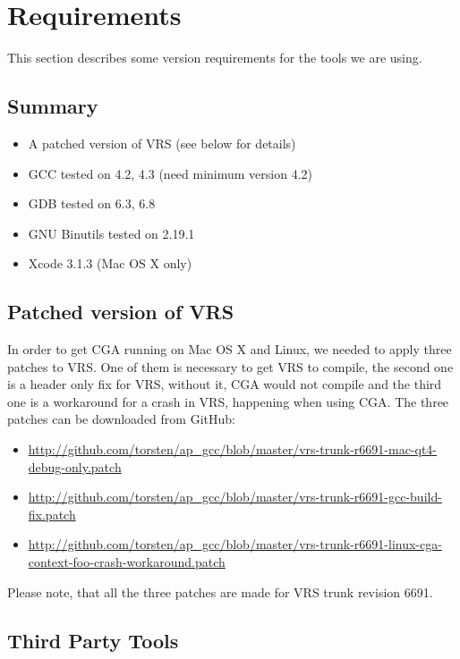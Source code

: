 
\section{Requirements} This section describes some version requirements for the tools we are using. 

\subsection{Summary}
\begin{itemize}
  \item A patched version of VRS (see below for details)
	\item GCC tested on 4.2, 4.3 (need minimum version 4.2)
	\item GDB tested on 6.3, 6.8
	\item GNU Binutils tested on 2.19.1
	\item Xcode 3.1.3 (Mac OS X only)
\end{itemize}

\subsection{Patched version of VRS}

In order to get CGA running on Mac OS X and Linux, we needed to apply three patches to VRS. One of them is necessary to get VRS to compile, the second one is a header only fix for VRS, without it, CGA would not compile and the third one is a workaround for a crash in VRS, happening when using CGA. The three patches can be downloaded from GitHub:

\begin{itemize}
\item \url{http://github.com/torsten/ap_gcc/blob/master/vrs-trunk-r6691-mac-qt4-debug-only.patch} 
\item \url{http://github.com/torsten/ap_gcc/blob/master/vrs-trunk-r6691-gcc-build-fix.patch}
\item \url{http://github.com/torsten/ap_gcc/blob/master/vrs-trunk-r6691-linux-cga-context-foo-crash-workaround.patch}
\end{itemize}

Please note, that all the three patches are made for VRS trunk revision 6691.

\subsection{Third Party Tools}

